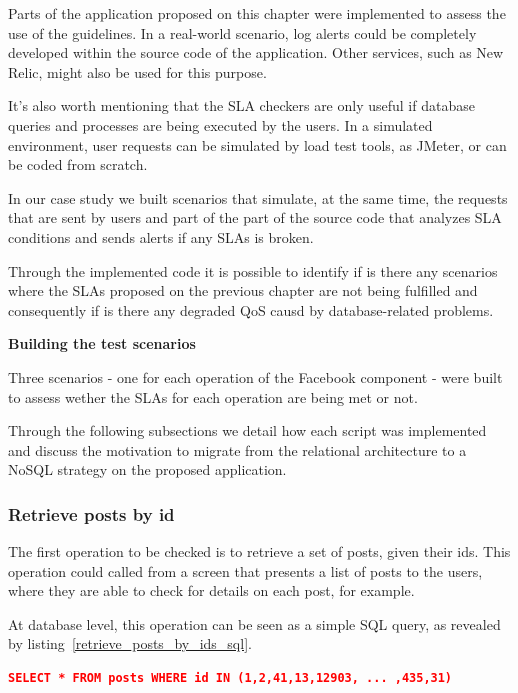 Parts of the application proposed on this chapter were implemented to assess the use of the guidelines. In a real-world scenario, log alerts could be completely developed within the source code of the application. Other services, such as New Relic, might also be used for this purpose. 

It's also worth mentioning that the SLA checkers are only useful if database queries and processes are being executed by the users. In a simulated environment, user requests can be simulated by load test tools, as JMeter, or can be coded from scratch.  

In our case study we built scenarios that simulate, at the same time, the requests that are sent by users and part of the part of the source code that analyzes SLA conditions and sends alerts if any SLAs is broken. 

Through the implemented code it is possible to identify if is there any scenarios where the SLAs proposed on the previous chapter are not being fulfilled and consequently if is there any degraded QoS causd by database-related problems.

\textbf{Building the test scenarios}

Three scenarios - one for each operation of the Facebook component - were built to assess wether the SLAs for each operation are being met or not.

Through the following subsections we detail how each script was implemented and discuss the motivation to migrate from the relational architecture to a NoSQL strategy on the proposed application. 


\subsubsection{Retrieve posts by id}

The first operation to be checked is to retrieve a set of posts, given their ids. This operation could called from a screen that presents a list of posts to the users, where they are able to check for details on each post, for example. 

At database level, this operation can be seen as a simple SQL query, as revealed by listing~\ref{retrieve_posts_by_ids_sql}. 

\begin{lstlisting}[language=json,firstnumber=1, caption=SQL Query - Retrieve posts by ids, label=retrieve_posts_by_ids_sql]
SELECT * FROM posts WHERE id IN (1,2,41,13,12903, ... ,435,31)
\end{lstlisting}\label{query01}

